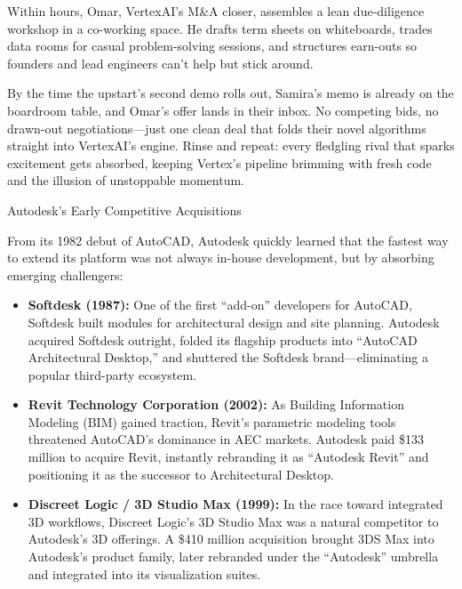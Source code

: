 Within hours, Omar, VertexAI’s M\&A closer, assembles a lean due-diligence workshop in a co-working space. He drafts 
term sheets on whiteboards, trades data rooms for casual problem-solving sessions, and structures earn-outs so 
founders and lead engineers can’t help but stick around.

By the time the upstart’s second demo rolls out, Samira’s memo is already on the boardroom table, and Omar’s offer 
lands in their inbox. No competing bids, no drawn-out negotiations—just one clean deal that folds their novel algorithms 
straight into VertexAI’s engine. Rinse and repeat: every fledgling rival that sparks excitement gets absorbed, keeping 
Vertex’s pipeline brimming with fresh code and the illusion of unstoppable momentum.

\medskip

\begin{HistoricalSidebar}{Autodesk’s Early Competitive Acquisitions}

  From its 1982 debut of AutoCAD, Autodesk quickly learned that the fastest way to extend its platform was not always 
  in-house development, but by absorbing emerging challengers:

  \medskip
  
  \begin{itemize}
    \item \textbf{Softdesk (1987):}  One of the first “add-on” developers for AutoCAD, Softdesk built modules for 
    architectural design and site planning.  Autodesk acquired Softdesk outright, folded its flagship products into 
    “AutoCAD Architectural Desktop,” and shuttered the Softdesk brand—eliminating a popular third-party ecosystem.

    \medskip

    \item \textbf{Revit Technology Corporation (2002):}  As Building Information Modeling (BIM) gained traction, 
    Revit’s parametric modeling tools threatened AutoCAD’s dominance in AEC markets.  Autodesk paid \$133 million 
    to acquire Revit, instantly rebranding it as “Autodesk Revit” and positioning it as the successor to Architectural 
    Desktop.

    \medskip

    \item \textbf{Discreet Logic / 3D Studio Max (1999):}  In the race toward integrated 3D workflows, Discreet 
    Logic’s 3D Studio Max was a natural competitor to Autodesk’s 3D offerings.  A \$410 million acquisition brought 
    3DS Max into Autodesk’s product family, later rebranded under the “Autodesk” umbrella and integrated into its 
    visualization suites.


\end{itemize}
\end{HistoricalSidebar}
